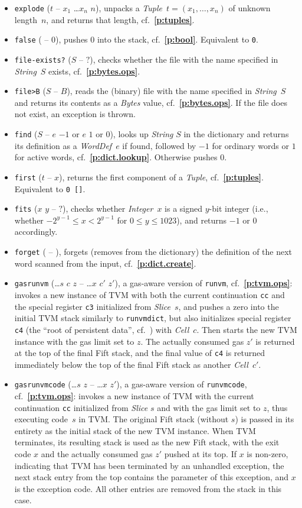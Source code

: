 \documentclass[12pt,oneside]{article}
\def\refpoint#1{{\rm\textbf{\ref{#1}}}}
\let\ptref=\refpoint
\begin{document}
\begin{itemize}
\item {\tt explode} ($t$ -- $x_1$ \dots $x_n$ $n$), unpacks a {\em Tuple\/}~$t=(x_1,\ldots,x_n)$ of unknown length~$n$, and returns that length, cf.~\ptref{p:tuples}.
\item {\tt false} ( -- $0$), pushes $0$ into the stack, cf.~\ptref{p:bool}. Equivalent to {\tt 0}.
\item {\tt file-exists?} ($S$ -- $?$), checks whether the file with the name specified in {\em String\/}~$S$ exists, cf.~\ptref{p:bytes.ops}.
\item {\tt file>B} ($S$ -- $B$), reads the (binary) file with the name specified in {\em String\/}~$S$ and returns its contents as a {\em Bytes\/} value, cf.~\ptref{p:bytes.ops}. If the file does not exist, an exception is thrown.
\item {\tt find} ($S$ -- $e$ $-1$ or $e$ $1$ or $0$), looks up {\em String\/} $S$ in the dictionary and returns its definition as a {\em WordDef\/}~$e$ if found, followed by $-1$ for ordinary words or $1$ for active words, cf.~\ptref{p:dict.lookup}. Otherwise pushes $0$.
\item {\tt first} ($t$ -- $x$), returns the first component of a {\em Tuple}, cf.~\ptref{p:tuples}. Equivalent to {\tt 0 []}.
\item {\tt fits} ($x$ $y$ -- $?$), checks whether {\em Integer\/}~$x$ is a signed $y$-bit integer (i.e., whether $-2^{y-1}\leq x<2^{y-1}$ for $0\leq y\leq 1023$), and returns $-1$ or $0$ accordingly.
\item {\tt forget} ( -- ), forgets (removes from the dictionary) the definition of the next word scanned from the input, cf.~\ptref{p:dict.create}.
\item {\tt gasrunvm} (\dots $s$ $c$ $z$ -- \dots $x$ $c'$ $z'$), a gas-aware version of {\tt runvm}, cf.~\ptref{p:tvm.ops}: invokes a new instance of TVM with both the current continuation {\tt cc} and the special register {\tt c3} initialized from {\em Slice\/}~$s$, and pushes a zero into the initial TVM stack similarly to {\tt runvmdict}, but also initializes special register {\tt c4} (the ``root of persistent data'', cf.~\cite[1.4]{TVM}) with {\em Cell\/}~$c$. Then starts the new TVM instance with the gas limit set to $z$. The actually consumed gas $z'$ is returned at the top of the final Fift stack, and the final value of {\tt c4} is returned immediately below the top of the final Fift stack as another {\em Cell\/}~$c'$.
\item {\tt gasrunvmcode} (\dots $s$ $z$ -- \dots $x$ $z'$), a gas-aware version of {\tt runvmcode}, cf.~\ptref{p:tvm.ops}: invokes a new instance of TVM with the current continuation {\tt cc} initialized from {\em Slice\/} $s$ and with the gas limit set to $z$, thus executing code~$s$ in TVM. The original Fift stack (without $s$) is passed in its entirety as the initial stack of the new TVM instance. When TVM terminates, its resulting stack is used as the new Fift stack, with the exit code $x$ and the actually consumed gas $z'$ pushed at its top. If $x$ is non-zero, indicating that TVM has been terminated by an unhandled exception, the next stack entry from the top contains the parameter of this exception, and $x$ is the exception code. All other entries are removed from the stack in this case.

\end{itemize}
\end{document}
